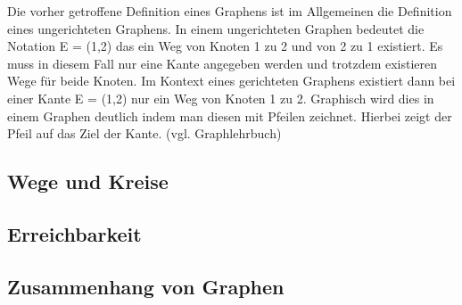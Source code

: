 Die vorher getroffene Definition eines Graphens ist im Allgemeinen die Definition eines ungerichteten Graphens.
In einem ungerichteten Graphen bedeutet die Notation E = {(1,2)} das ein Weg von Knoten 1 zu 2 und von 2 zu 1 existiert.
Es muss in diesem Fall nur eine Kante angegeben werden und trotzdem existieren Wege für beide Knoten.
Im Kontext eines gerichteten Graphens existiert dann bei einer Kante E = {(1,2)} nur ein Weg von Knoten 1 zu 2.
Graphisch wird dies in einem Graphen deutlich indem man diesen mit Pfeilen zeichnet. Hierbei zeigt der Pfeil auf das Ziel
der Kante. (vgl. Graphlehrbuch)






\subsection{Wege und Kreise}

\subsection{Erreichbarkeit}

\subsection{Zusammenhang von Graphen}

